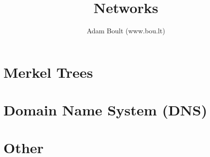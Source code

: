 \documentclass[oneside]{book}
\begin{document}
\author{Adam Boult (www.bou.lt)}
\title{Networks}
\maketitle

\setcounter{tocdepth}{0}
\tableofcontents



\part{Merkel Trees}


\part{Domain Name System (DNS)}

\part{Other}


\end{document}
